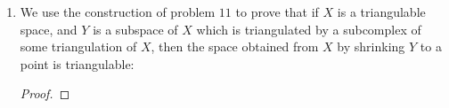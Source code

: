 \documentclass{book}
\begin{document}
\begin{enumerate}[(1)]
\begin{itemize}
            \item $|N|$ is a neighbourhood of $|L|$ in $|K|$: 
                \begin{proof} Let $y \in |L|$ and let $V$ be the union of simplices in $K^2$ which contain $y$. Then, $V$ contains a neighbourhood of $y$. Since every simplex in $V$ is contained in $|N|$, $|N|$ is a neighbourhood of $|L|$ in $|K|$.   
                \end{proof}
        \end{itemize}

    \item We use the construction of problem $11$ to prove that if $X$ is a triangulable space, and $Y$ is a subspace of $X$ which is triangulated by a subcomplex of some triangulation of $X$, then the space obtained from $X$ by shrinking $Y$ to a point is triangulable: 
        \begin{proof}
        \end{proof}
\end{enumerate}
\end{document}
